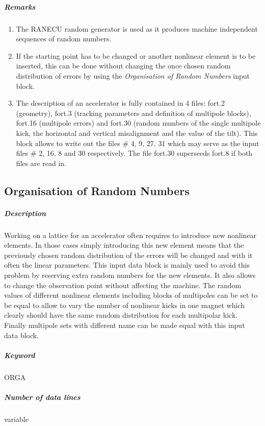 \subparagraph{Remarks}
\begin{enumerate}
\item The RANECU random generator \cite{RANECU} is used as it produces
  machine independent sequences of random numbers.
\item If the starting point has to be changed or another nonlinear
  element is to be inserted, this can be done without changing the
  once chosen random distribution of errors by using the {\em
    Organisation of Random Numbers} \/input block.
\item The description of an accelerator is fully contained in 4 files:
  fort.2 (geometry), fort.3 (tracking parameters and definition of
  multipole blocks), fort.16 (multipole errors) and fort.30 (random
  numbers of the single multipole kick, the horizontal and vertical
  misalignment and the value of the tilt). This block allows to write
  out the files \# 4, 9, 27, 31 which may serve as the input files \#
  2, 16, 8 and 30 respectively. The file fort.30 superseeds fort.8 if
  both files are read in.
\end{enumerate}

\subsection{Organisation of Random Numbers} \label{OrgRan}

\subparagraph{Description} Working on a lattice for an accelerator
often requires to introduce new nonlinear elements. In those cases
simply introducing this new element means that the previously chosen
random distribution of the errors will be changed and with it often
the linear parameters. This input data block is mainly used to avoid
this problem by reserving extra random numbers for the new elements.
It also allows to change the observation point without affecting the
machine. The random values of different nonlinear elements including
blocks of multipoles can be set to be equal to allow to vary the
number of nonlinear kicks in one magnet which clearly should have the
same random distribution for each multipolar kick. Finally multipole
sets with different name can be made equal with this input data block.

\subparagraph{Keyword} ORGA \subparagraph{Number of data lines}
variable

